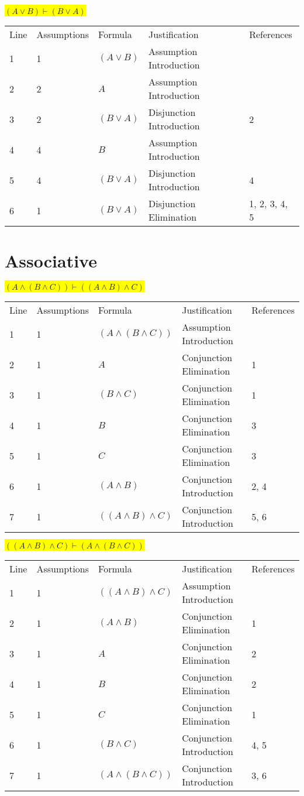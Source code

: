 \documentclass[12pt]{article}
\newcommand{\pr}[1]{\bigbreak \colorbox{Yellow}{$#1$} \smallbreak}
\begin{document}
\begin{flushleft}
\pr{(A \lor B) \vdash (B \lor A)}
\begin{tabular}{lllll}
    Line & Assumptions & Formula & Justification & References \\
    1 & 1 & $(A\lor B)$  & Assumption Introduction &  \\
    2 & 2 & $A$  & Assumption Introduction &  \\
    3 & 2 & $(B\lor A)$  & Disjunction Introduction & 2 \\
    4 & 4 & $B$  & Assumption Introduction &  \\
    5 & 4 & $(B\lor A)$  & Disjunction Introduction & 4 \\
    6 & 1 & $(B\lor A)$  & Disjunction Elimination & 1, 2, 3, 4, 5 \\
\end{tabular}

\section{Associative}
\pr{(A\land (B\land C)) \vdash ((A\land B)\land C)}
\begin{tabular}{lllll}
    Line & Assumptions & Formula & Justification & References \\
    1 & 1 & $(A\land (B\land C))$  & Assumption Introduction &  \\
    2 & 1 & $A$  & Conjunction Elimination & 1 \\
    3 & 1 & $(B\land C)$  & Conjunction Elimination & 1 \\
    4 & 1 & $B$  & Conjunction Elimination & 3 \\
    5 & 1 & $C$  & Conjunction Elimination & 3 \\
    6 & 1 & $(A\land B)$  & Conjunction Introduction & 2, 4 \\
    7 & 1 & $((A\land B)\land C)$  & Conjunction Introduction & 5, 6 \\
\end{tabular}

\pr{((A\land B)\land C) \vdash (A\land (B\land C))}
\begin{tabular}{lllll}
    Line & Assumptions & Formula & Justification & References \\
    1 & 1 & $((A\land B)\land C)$  & Assumption Introduction &  \\
    2 & 1 & $(A\land B)$  & Conjunction Elimination & 1 \\
    3 & 1 & $A$  & Conjunction Elimination & 2 \\
    4 & 1 & $B$  & Conjunction Elimination & 2 \\
    5 & 1 & $C$  & Conjunction Elimination & 1 \\
    6 & 1 & $(B\land C)$  & Conjunction Introduction & 4, 5 \\
    7 & 1 & $(A\land (B\land C))$  & Conjunction Introduction & 3, 6 \\
\end{tabular}


\end{flushleft}
\end{document}
